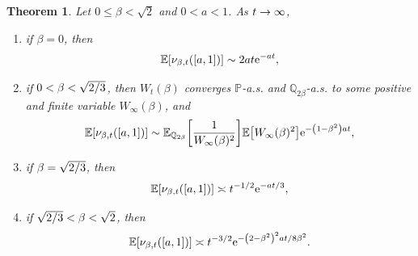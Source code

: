 \documentclass[10pt]{amsart}
\newtheorem{theo}{Theorem}[section]
\theoremstyle{definition}\newtheorem{defi}[theo]{Definition}\newtheorem{rema}[theo]{Remark}\newtheorem{exam}[theo]{Example}\newtheorem{exem}[theo]{Example}\newtheorem{nota}[theo]{Notation}
\newcommand{\e}{\mathrm{e}}
\newcommand{\E}{\mathbb{E}}
\renewcommand{\P}{\mathbb{P}}
\newcommand{\Q}{\mathbb{Q}}
\newcommand\1{\mathds{1}}
\newcommand{\Expec}[1]{\mathbb{E}\left[#1\right]}
\newcommand*{\relabel}{\renewcommand{\labelenumi}{(\theenumi)}}
\newcommand*{\romanenumi}{\renewcommand*{\theenumi}{\roman{enumi}}\relabel}
\let\originalleft\left
\let\originalright\right
\renewcommand{\left}{\mathopen{}\mathclose\bgroup\originalleft}
\renewcommand{\right}{\aftergroup\egroup\originalright}
\renewcommand*{\to}{\mathchoice{\longrightarrow}{\rightarrow}{\rightarrow}{\rightarrow}}
\begin{document}
\begin{theo}\label{thm:asymptotics_in_mean}
Let $0 \leq \beta < \sqrt{2}$ and $0 < a < 1$. As $t \to \infty$,
\begin{enumerate}\romanenumi
\item\label{it:asymptotics_in_mean_1}
if $\beta = 0$, then
\begin{equation*}
\Expec{\nu_{\beta, t}([a, 1])} \sim 2at \e^{-at},
\end{equation*}
\item\label{it:asymptotics_in_mean_2}
if $0 < \beta < \sqrt{2\smash{/}3}$, then $W_t(\beta)$ converges $\P$-a.s. and $\Q_{2\beta}$-a.s. to some positive and finite variable $W_\infty(\beta)$, and
\begin{equation*}
\Expec{\nu_{\beta, t}([a, 1])} \sim \E_{\Q_{2\beta}} \left[\frac{1}{W_\infty(\beta)^2} \right] \Expec{W_\infty(\beta)^2} \e^{-\left(1 - \beta^2\right)at},
\end{equation*}
\item\label{it:asymptotics_in_mean_3}
if $\beta = \sqrt{2\smash{/}3}$, then
\begin{equation*}
\E \left[\nu_{\beta, t}([a, 1]) \right] \asymp t^{-1/2} \e^{-at/3},
\end{equation*}
\item\label{it:asymptotics_in_mean_4}
if $\sqrt{2\smash{/}3} < \beta < \sqrt{2}$, then
\begin{equation*}
\E \left[\nu_{\beta, t}([a, 1]) \right] \asymp t^{-3/2} \e^{-\left(2 - \beta^2\right)^2at/8\beta^2}.
\end{equation*}
\end{enumerate}
\end{theo}
\end{document}
